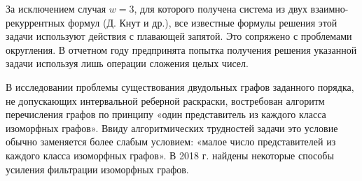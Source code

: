 За исключением  случая $w=3$, для которого получена система из двух взаимно-рекуррентных формул (Д. Кнут и др.), все известные формулы решения этой задачи используют действия с плавающей запятой. Это сопряжено с проблемами округления.
%
В отчетном году предпринята попытка получения решения указанной задачи используя лишь операции сложения целых чисел.


В исследовании проблемы существования двудольных графов заданного порядка, не допускающих интервальной реберной раскраски, востребован алгоритм перечисления графов по принципу «один представитель из каждого класса изоморфных графов». Ввиду алгоритмических трудностей задачи это условие обычно заменяется более слабым условием: «малое число представителей из каждого класса изоморфных графов». В 2018 г. найдены некоторые способы усиления фильтрации изоморфных графов.



%
%







